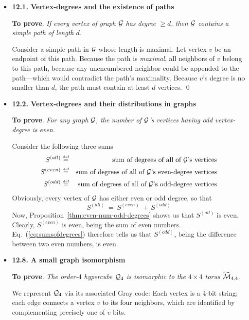 \begin{itemize}
\item
{\bf 12.1. Vertex-degrees and the existence of paths}
\smallskip

{\bf To prove}. {\em If every vertex of graph $\mbox{$\cal G$}$ has degree $\geq d$, then $\mbox{$\cal G$}$ contains a {\em simple} path of length $d$.}
\smallskip

Consider a simple path in $\mbox{$\cal G$}$ whose length is maximal.  Let vertex $v$ be an endpoint of this path.  Because the path is {\em maximal}, all neighbors of $v$ belong to this path, because any unencumbered neighbor could be appended to the path---which would contradict the path's maximality.  Because $v$'s degree is no smaller than $d$, the path must contain at least $d$ vertices.  \qed

\medskip\item
{\bf 12.2. Vertex-degrees and their distributions in graphs}
\smallskip

{\bf To prove}.  {\em For any graph $\mbox{$\cal G$}$, the number of $\mbox{$\cal G$}$'s vertices having odd vertex-degree is even.}

\smallskip

Consider the following three sums
\begin{eqnarray*}
S^{(all)}     & \stackrel{\mbox{{\tiny def}}}{=} & \mbox{sum of degrees of all of $\mbox{$\cal G$}$'s vertices} \\
S^{(even)} & \stackrel{\mbox{{\tiny def}}}{=} & \mbox{sum of degrees of all of $\mbox{$\cal G$}$'s even-degree vertices} \\
S^{(odd)}  & \stackrel{\mbox{{\tiny def}}}{=} & \mbox{sum of degrees of all of $\mbox{$\cal G$}$'s odd-degree vertices}
\end{eqnarray*}
Obviously, every vertex of $\mbox{$\cal G$}$ has either even or odd degree, so that
\begin{equation}
\label{eq:sumsofdegrees}
S^{(all)} \ = \ S^{(even)} \ + \ S^{(odd)}
\end{equation} 
Now, Proposition~\ref{thm:even-num-odd-degrees} shows us that $S^{(all)}$ is even.  Clearly, $S^{(even)}$ is even, being the sum of even numbers.  Eq.~(\ref{eq:sumsofdegrees}) therefore tells us that $S^{(odd)}$, being the difference between two even numbers, is even.


\medskip\item
{\bf 12.8. A small graph isomorphism}
\smallskip

{\bf To prove}.  {\em The order-$4$ hypercube $\mbox{$\cal Q$}_4$ is \textit{isomorphic} to the $4 \times 4$ torus $\widetilde{\mbox{$\cal M$}}_{4,4}$.}
\medskip

We represent $\mbox{$\cal Q$}_4$ via its associated Gray code:  Each vertex is a 4-bit string; each edge connects a vertex $v$  to its four neighbors, which are identified by complementing precisely one of $v$ bits.


\end{itemize}
